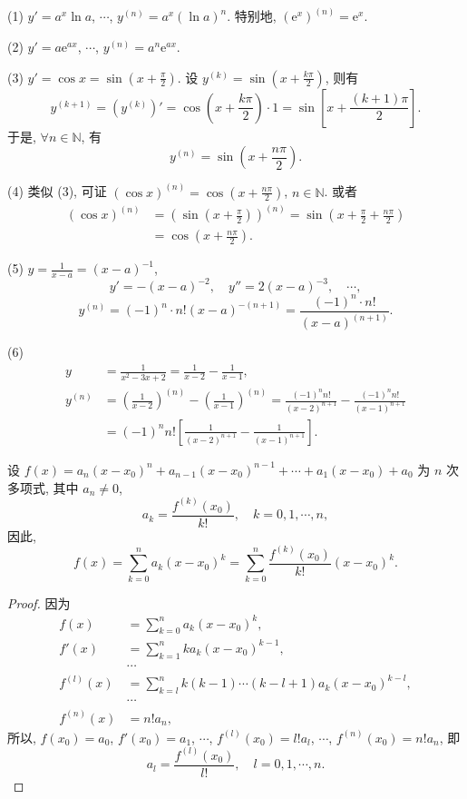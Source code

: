 \begin{solution}
(1) $y' = a^{x}\ln a$, $\cdots$, $y^{(n)} = a^{x}(\ln a)^{n}$. 特别地, $\left(\mathrm{e}^{x}\right)^{(n)} = \mathrm{e}^{x}$.

(2) $y' = a\mathrm{e}^{ax}$, $\cdots$, $y^{(n)} = a^{n}\mathrm{e}^{ax}$.

(3) $y' = \cos x = \sin\left(x + \frac{\pi}{2}\right)$. 设 $y^{(k)} = \sin\left(x + \frac{k\pi}{2}\right)$, 则有
\[
y^{(k+1)} = (y^{(k)})' = \cos\left(x + \frac{k\pi}{2}\right)\cdot1 = \sin\left[x + \frac{(k+1)\pi}{2}\right].
\]
于是, $\forall n \in \mathbb{N}$, 有
\[
y^{(n)} = \sin\left(x + \frac{n\pi}{2}\right).
\]

(4) 类似 (3), 可证 $(\cos x)^{(n)} = \cos\left(x + \frac{n\pi}{2}\right)$, $n \in \mathbb{N}$. 或者
\[
\begin{aligned}
(\cos x)^{(n)} &= \left(\sin\left(x + \frac{\pi}{2}\right)\right)^{(n)} = \sin\left(x + \frac{\pi}{2} + \frac{n\pi}{2}\right)\\
&= \cos\left(x + \frac{n\pi}{2}\right).
\end{aligned}
\]

(5) $y = \frac{1}{x-a} = (x-a)^{-1}$,
\[
y' = -(x-a)^{-2},\quad y'' = 2(x-a)^{-3},\quad \cdots,
\]
\[
y^{(n)} = (-1)^{n}\cdot n!(x-a)^{-(n+1)} = \frac{(-1)^{n}\cdot n!}{(x-a)^{(n+1)}}.
\]

(6)
\[
\begin{aligned}
y &= \frac{1}{x^{2}-3x+2} = \frac{1}{x-2} - \frac{1}{x-1},\\
y^{(n)} &= \left(\frac{1}{x-2}\right)^{(n)} - \left(\frac{1}{x-1}\right)^{(n)} = \frac{(-1)^{n}n!}{(x-2)^{n+1}} - \frac{(-1)^{n}n!}{(x-1)^{n+1}}\\
&= (-1)^{n}n!\left[\frac{1}{(x-2)^{n+1}} - \frac{1}{(x-1)^{n+1}}\right].
\end{aligned}
\]
\end{solution}

\begin{example}\label{ex:3.2.3}
设 $f(x) = a_{n}(x-x_0)^{n} + a_{n-1}(x-x_0)^{n-1} + \cdots + a_{1}(x-x_0) + a_{0}$ 为 $n$ 次多项式, 其中 $a_{n} \neq 0$,
\[
a_{k} = \frac{f^{(k)}(x_0)}{k!},\quad k = 0, 1, \cdots, n,
\]
因此,
\[
f(x) = \sum_{k=0}^{n}a_{k}(x-x_0)^{k} = \sum_{k=0}^{n}\frac{f^{(k)}(x_0)}{k!}(x-x_0)^{k}.
\]
\end{example}

\begin{proof}
因为
\[
\begin{aligned}
f(x) &= \sum_{k=0}^{n}a_{k}(x-x_0)^{k},\\
f'(x) &= \sum_{k=1}^{n}ka_{k}(x-x_0)^{k-1},\\
&\cdots\\
f^{(l)}(x) &= \sum_{k=l}^{n}k(k-1)\cdots(k-l+1)a_{k}(x-x_0)^{k-l},\\
&\cdots\\
f^{(n)}(x) &= n!a_{n},
\end{aligned}
\]
所以, $f(x_0) = a_0$, $f'(x_0) = a_1$, $\cdots$, $f^{(l)}(x_0) = l!a_l$, $\cdots$, $f^{(n)}(x_0) = n!a_n$, 即
\[
a_{l} = \frac{f^{(l)}(x_0)}{l!},\quad l = 0, 1, \cdots, n.
\]
\end{proof}

